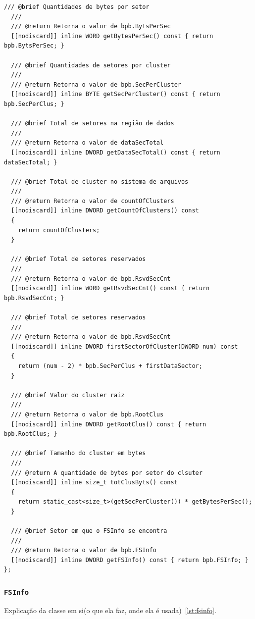 \documentclass[
    12pt,				%
    oneside,   	        %
    a4paper,			%
    english,			%
    french,				%
    spanish,			%
    brazil,				%
    ]{pacotes/abntex2}
\begin{document}
\begin{lstlisting}[caption={Classe que abstrai a extração de informações da estrutura BPB}, label={lst:biosblock}]
  /// @brief Quantidades de bytes por setor
  ///
  /// @return Retorna o valor de bpb.BytsPerSec
  [[nodiscard]] inline WORD getBytesPerSec() const { return bpb.BytsPerSec; }

  /// @brief Quantidades de setores por cluster
  ///
  /// @return Retorna o valor de bpb.SecPerCluster
  [[nodiscard]] inline BYTE getSecPerCluster() const { return bpb.SecPerClus; }

  /// @brief Total de setores na região de dados
  ///
  /// @return Retorna o valor de dataSecTotal
  [[nodiscard]] inline DWORD getDataSecTotal() const { return dataSecTotal; }

  /// @brief Total de cluster no sistema de arquivos
  ///
  /// @return Retorna o valor de countOfClusters
  [[nodiscard]] inline DWORD getCountOfClusters() const
  {
    return countOfClusters;
  }

  /// @brief Total de setores reservados
  ///
  /// @return Retorna o valor de bpb.RsvdSecCnt
  [[nodiscard]] inline WORD getRsvdSecCnt() const { return bpb.RsvdSecCnt; }

  /// @brief Total de setores reservados
  ///
  /// @return Retorna o valor de bpb.RsvdSecCnt
  [[nodiscard]] inline DWORD firstSectorOfCluster(DWORD num) const
  {
    return (num - 2) * bpb.SecPerClus + firstDataSector;
  }

  /// @brief Valor do cluster raiz
  ///
  /// @return Retorna o valor de bpb.RootClus
  [[nodiscard]] inline DWORD getRootClus() const { return bpb.RootClus; }

  /// @brief Tamanho do cluster em bytes
  ///
  /// @return A quantidade de bytes por setor do clsuter
  [[nodiscard]] inline size_t totClusByts() const
  {
    return static_cast<size_t>(getSecPerCluster()) * getBytesPerSec();
  }

  /// @brief Setor em que o FSInfo se encontra
  ///
  /// @return Retorna o valor de bpb.FSInfo
  [[nodiscard]] inline DWORD getFSInfo() const { return bpb.FSInfo; }
};
\end{lstlisting}

\subsubsection{\texttt{FSInfo}}
\label{subsubsec:fsinfo}

Explicação da classe em si(o que ela faz, onde ela é usada)~\ref{lst:fsinfo}.
\end{document}
